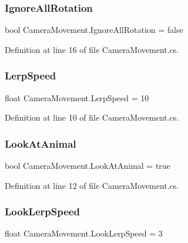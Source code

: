 \subsubsection{\texorpdfstring{Ignore\+All\+Rotation}{IgnoreAllRotation}}
{\footnotesize\ttfamily bool Camera\+Movement.\+Ignore\+All\+Rotation = false}



Definition at line 16 of file Camera\+Movement.\+cs.

\mbox{\label{class_camera_movement_a384ba60cc3c7882ca87a111d5ac583fd}} 
\subsubsection{\texorpdfstring{Lerp\+Speed}{LerpSpeed}}
{\footnotesize\ttfamily float Camera\+Movement.\+Lerp\+Speed = 10}



Definition at line 10 of file Camera\+Movement.\+cs.

\mbox{\label{class_camera_movement_a7b0a25043de0fa965caa13a65b6cbaa0}} 
\subsubsection{\texorpdfstring{Look\+At\+Animal}{LookAtAnimal}}
{\footnotesize\ttfamily bool Camera\+Movement.\+Look\+At\+Animal = true}



Definition at line 12 of file Camera\+Movement.\+cs.

\mbox{\label{class_camera_movement_ad6d5e5470aacd6a67cc06cd1df7a0f78}} 
\subsubsection{\texorpdfstring{Look\+Lerp\+Speed}{LookLerpSpeed}}
{\footnotesize\ttfamily float Camera\+Movement.\+Look\+Lerp\+Speed = 3}



